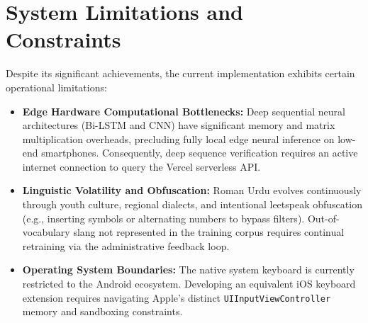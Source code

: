 \documentclass[A4paper,12pt]{report}
\theoremstyle{plain}
\theoremstyle{definition}
\theoremstyle{remark}
\numberwithin{equation}{section}
\begin{document}
\section{System Limitations and Constraints}
Despite its significant achievements, the current implementation exhibits certain operational limitations:
\begin{itemize}[leftmargin=*]
    \item \textbf{Edge Hardware Computational Bottlenecks:} Deep sequential neural architectures (Bi-LSTM and CNN) have significant memory and matrix multiplication overheads, precluding fully local edge neural inference on low-end smartphones. Consequently, deep sequence verification requires an active internet connection to query the Vercel serverless API.
    \item \textbf{Linguistic Volatility and Obfuscation:} Roman Urdu evolves continuously through youth culture, regional dialects, and intentional leetspeak obfuscation (e.g., inserting symbols or alternating numbers to bypass filters). Out-of-vocabulary slang not represented in the training corpus requires continual retraining via the administrative feedback loop.
    \item \textbf{Operating System Boundaries:} The native system keyboard is currently restricted to the Android ecosystem. Developing an equivalent iOS keyboard extension requires navigating Apple's distinct \texttt{UIInputViewController} memory and sandboxing constraints.
\end{itemize}
\end{document}

